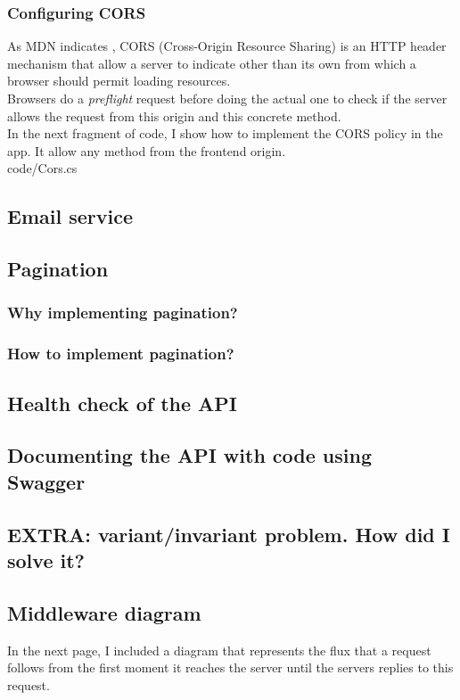         \subsubsection{Configuring CORS}
    As MDN indicates \cite{CORS}, CORS (Cross-Origin Resource Sharing) is an HTTP header mechanism that allow a server to indicate other than its own from which a browser should permit loading resources. \\
    Browsers do a \textit{preflight} request before doing the actual one to check if the server allows the request from this origin and this concrete method. \\

    In the next fragment of code, I show how to implement the CORS policy in the app. It allow any method from the frontend origin. \\
    
    {code/Cors.cs}

    \subsection{Email service}
    \subsection{Pagination}
        \subsubsection{Why implementing pagination?}
        \subsubsection{How to implement pagination?}
    \subsection{Health check of the API}
    \subsection{Documenting the API with code using Swagger}
    \subsection{EXTRA: variant/invariant problem. How did I solve it?}
    \subsection{Middleware diagram}
    In the next page, I included a diagram that represents the flux that a request follows from the first moment it reaches the server until the servers replies to this request. \\

